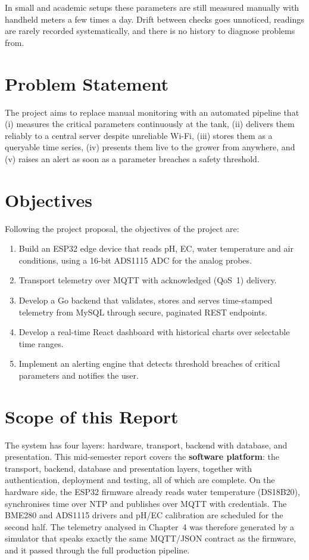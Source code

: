 \documentclass[11pt,a4paper,oneside]{report}
\begin{document}
In small and academic setups these parameters are still measured manually with
handheld meters a few times a day. Drift between checks goes unnoticed, readings are
rarely recorded systematically, and there is no history to diagnose problems from.

\section{Problem Statement}
The project aims to replace manual monitoring with an automated pipeline that
(i) measures the critical parameters continuously at the tank, (ii) delivers them
reliably to a central server despite unreliable Wi-Fi, (iii) stores them as a queryable
time series, (iv) presents them live to the grower from anywhere, and (v) raises an
alert as soon as a parameter breaches a safety threshold.

\section{Objectives}
Following the project proposal, the objectives of the project are:
\begin{enumerate}
  \item Build an ESP32 edge device that reads pH, EC, water temperature and air
        conditions, using a 16-bit ADS1115 ADC for the analog probes.
  \item Transport telemetry over MQTT with acknowledged (QoS~1) delivery.
  \item Develop a Go backend that validates, stores and serves time-stamped telemetry
        from MySQL through secure, paginated REST endpoints.
  \item Develop a real-time React dashboard with historical charts over selectable
        time ranges.
  \item Implement an alerting engine that detects threshold breaches of critical
        parameters and notifies the user.
\end{enumerate}

\section{Scope of this Report}
The system has four layers: hardware, transport, backend with database, and
presentation. This mid-semester report covers the \textbf{software platform}: the
transport, backend, database and presentation layers, together with authentication,
deployment and testing, all of which are complete. On the hardware side, the ESP32
firmware already reads water temperature (DS18B20), synchronises time over NTP and
publishes over MQTT with credentials. The BME280 and ADS1115 drivers and pH/EC
calibration are scheduled for the second half. The telemetry analysed in Chapter~4
was therefore generated by a simulator that speaks exactly the same MQTT/JSON
contract as the firmware, and it passed through the full production pipeline.
\end{document}
